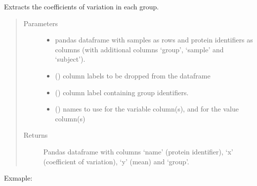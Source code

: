 \documentclass[letterpaper,10pt,english]{sphinxmanual}
\begin{document}
\begin{fulllineitems}
\label{\detokenize{_autosummary/analytics_core.analytics:analytics_core.analytics.analytics.get_coefficient_variation}}
Extracts the coefficients of variation in each group.
\begin{quote}\begin{description}
\item[{Parameters}] \leavevmode\begin{itemize}
\item {} 
 \textendash{} pandas dataframe with samples as rows and protein identifiers as columns (with additional columns ‘group’, ‘sample’ and ‘subject’).

\item {} 
 () \textendash{} column labels to be dropped from the dataframe

\item {} 
 () \textendash{} column label containing group identifiers.

\item {} 
 () \textendash{} names to use for the variable column(s), and for the value column(s)

\end{itemize}

\item[{Returns}] \leavevmode
Pandas dataframe with columns ‘name’ (protein identifier), ‘x’ (coefficient of variation), ‘y’ (mean) and ‘group’.

\end{description}\end{quote}

Exmaple:

\begin{sphinxVerbatim}[commandchars=\\\{\}]
   \PYG{p}{[} \PYG{p}{]} 
\end{sphinxVerbatim}

\end{fulllineitems}
\end{document}
